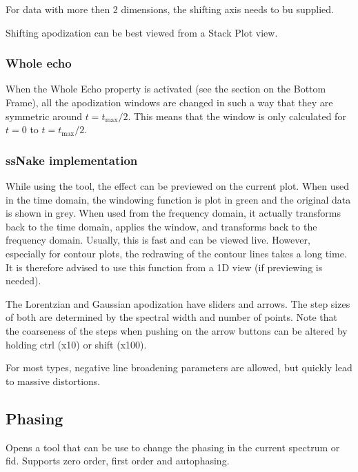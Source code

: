 \documentclass[11pt,a4paper]{article}
\begin{document}
For data with more then 2 dimensions, the shifting axis needs to bu supplied.

Shifting apodization can be best viewed from a Stack Plot view.

\subsubsection{Whole echo}
When the Whole Echo property is activated (see the section on the Bottom Frame), all the apodization windows
are changed in such a way that they are symmetric around $t = t_\text{max}/2$. This means that the window is
only calculated for $t=0$ to $t= t_\text{max}/2$. 

\subsubsection{ssNake implementation}
While using the tool, the effect can be previewed on the current plot. When used in the time
domain, the windowing function is plot in green and the original data is shown in grey. When used from the
frequency domain, it actually transforms back to the time domain, applies the window, and transforms back to
the frequency domain. Usually, this is fast and can be viewed live. However, especially for contour plots, the
redrawing of the contour lines takes a long time. It is therefore advised to use this function from a 1D view
(if previewing is needed).

The Lorentzian and Gaussian apodization have sliders and arrows. The step sizes of both are determined by the
spectral width and number of points. Note that the coarseness of the steps when pushing on the arrow buttons
can be altered by holding ctrl (x10) or shift (x100).

For most types, negative line broadening parameters are allowed, but quickly lead to massive distortions.


\subsection{Phasing}
Opens a tool that can be use to change the phasing in the current spectrum or fid. Supports zero order, first
order and autophasing.
\end{document}
